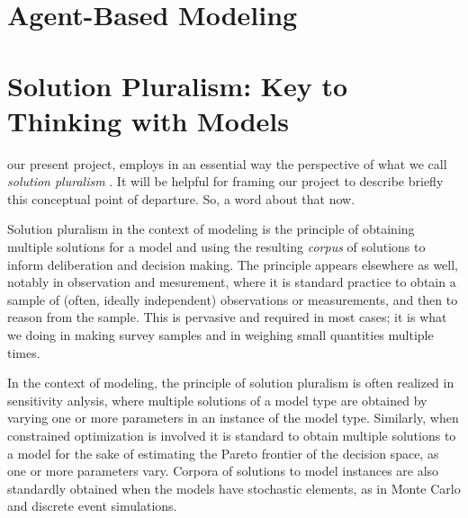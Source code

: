 \section{Agent-Based Modeling}

\citep{bankes_lempert_popper_2002,epstein_axtell_1996,gilbert_2008,grimm_railsback_2005,miller_page_2007,railsback_gramm_netlogo_2012,wilensky_rand_2015}


\section{Solution Pluralism: Key to Thinking with Models}

our present project, employs in an essential way the perspective of what we call \emph{solution pluralism} \citep{sok_etal_gecco_2012,sscr_redistricting_2013}.
It will be helpful for framing our project to describe briefly this conceptual point of departure. So, a word about that now.

Solution pluralism in the context of modeling is the principle of
obtaining multiple solutions for a model and using the resulting
\emph{corpus} of solutions to inform deliberation and decision making.
The principle appears elsewhere as well, notably in observation and
mesurement, where it is standard practice to obtain a sample of
(often, ideally independent) observations or measurements, and then to reason
from the sample. This is pervasive and required in most cases; it is
what we doing in making survey samples and in weighing small
quantities multiple times.  


In the context of modeling, the principle of solution pluralism is
often realized in sensitivity anlysis, where multiple solutions of a
model type are obtained by varying one or more parameters in an
instance of the model type. Similarly, when constrained optimization
is involved it is standard to obtain multiple solutions to a model for
the sake of estimating the Pareto frontier of the decision space, as
one or more parameters vary.  Corpora of solutions to model instances
are also standardly obtained when the models have stochastic elements,
as in Monte Carlo and discrete event simulations.



